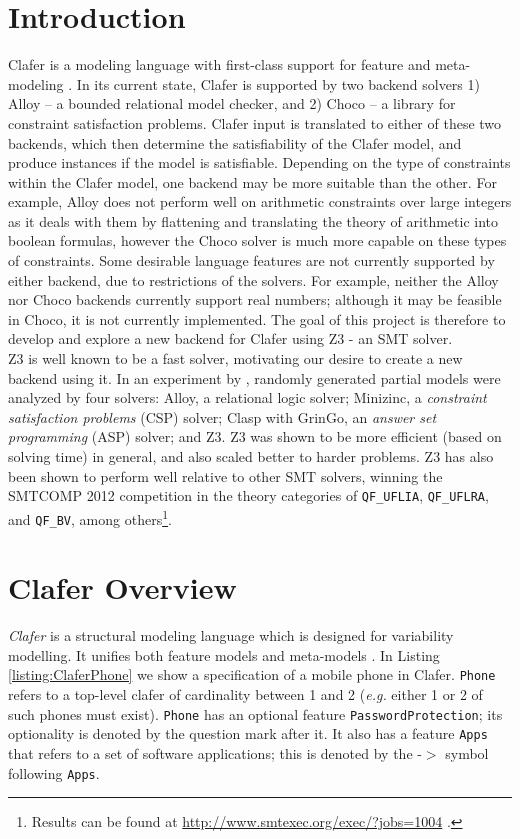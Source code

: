 \documentclass{article}
\newcommand{\eg}{\emph{e.g.}\xspace}
\begin{document}
\section{Introduction}
Clafer is a modeling language with first-class support for feature and meta-modeling \cite{BakClaferSLE2010}. In its current state, Clafer is supported by two backend solvers 1) Alloy -- a bounded relational model checker, and 2) Choco -- a library for constraint satisfaction problems. Clafer input is translated to either of these two backends, which then determine the satisfiability of the Clafer model, and produce instances if the model is satisfiable. Depending on the type of constraints within the Clafer model, one backend may be more suitable than the other. For example, Alloy does not perform well on arithmetic constraints over large integers as it deals with them by flattening and translating the theory of arithmetic into boolean formulas, however the Choco solver is much more capable on these types of constraints. Some desirable language features are not currently supported by either backend, due to restrictions of the solvers. For example, neither the Alloy nor Choco backends currently support real numbers; although it may be feasible in Choco, it is not currently implemented. The goal of this project is therefore to  develop and explore a new backend for Clafer using Z3 - an SMT solver. \\
\indent Z3 is well known to be a fast solver, motivating our desire to create a new backend using it. In an experiment by \cite{Saadatpanah2012}, randomly generated partial models were analyzed by four solvers: Alloy, a relational logic solver; Minizinc, a  \textit{constraint satisfaction problems} (CSP) solver; Clasp with GrinGo, an \textit{answer set programming} (ASP) solver; and Z3. Z3 was shown to be more efficient (based on solving time) in general, and also scaled better to harder problems. Z3 has also been shown to perform well relative to other SMT solvers, winning the SMTCOMP 2012 competition in the theory categories of \texttt{QF\_UFLIA}, \texttt{QF\_UFLRA}, and \texttt{QF\_BV}, among others\footnote{Results can be found at \url{http://www.smtexec.org/exec/?jobs=1004} .}.

\section{Clafer Overview}

\emph{Clafer} is a structural modeling language which is designed for variability modelling. It unifies both feature models  and meta-models \cite{BakClaferSLE2010}.
%
In Listing \ref{listing:ClaferPhone}  we show a specification of a mobile phone in Clafer. 
%
\texttt{Phone} refers to a top-level clafer of cardinality between 1 and 2 (\eg either 1 or 2 of such phones must exist). \texttt{Phone} has an optional feature \texttt{PasswordProtection}; its optionality is denoted by the question mark after it. It also has  a feature \texttt{Apps} that refers  to a set of software applications; this is denoted by the  -$>$ symbol following  \texttt{Apps}. 
\end{document}
